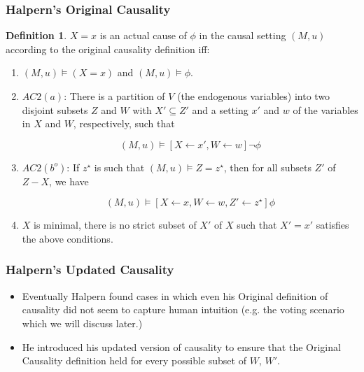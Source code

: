 \documentclass{beamer}
\theoremstyle{plain}
\theoremstyle{definition}
\newtheorem{defn}[thm]{Definition} %
\begin{document}
\begin{frame}
\frametitle{Halpern's Original Causality}
\begin{defn}$X=x$ is an actual cause of $\phi$ in the causal setting $(M,u)$ according to the original causality definition iff:
\begin{enumerate}
\item $(M,u) \models (X=x)$ and $(M,u) \models \phi$.
\item $AC2(a)$: There is a partition of $V$ (the endogenous variables) into two disjoint subsets $Z$ and $W$ with $X'\subseteq Z'$ and a setting $x'$ and $w$ of the variables in $X$ and $W$, respectively, such that

\[
(M,u) \models [X\leftarrow x', W\leftarrow w]\lnot \phi
\] 

\item $AC2(b^o)$: If $z^\star$ is such that $(M,u)\models Z = z^\star$, then for all subsets $Z'$ of $Z-X$, we have

\[
(M,u) \models [X\leftarrow x, W \leftarrow w, Z' \leftarrow z^\star]\phi
\] 

\item $X$ is minimal, there is no strict subset of $X'$ of $X$ such that $X' = x'$ satisfies the above conditions.
\end{enumerate}

\end{defn}
\end{frame}




\begin{frame}
\frametitle{Halpern's Updated Causality}
\begin{itemize}


\item Eventually Halpern found cases in which even his Original definition of causality did not seem to capture human intuition (e.g. the voting scenario which we will discuss later.)
\item He introduced his updated version of causality to ensure that the Original Causality definition held for every possible subset of $W$, $W'$.
\end{itemize}
\end{frame}
\end{document}
